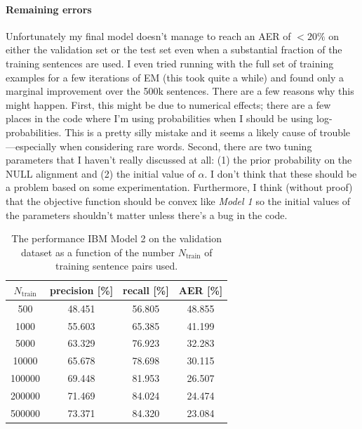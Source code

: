 \documentclass[11pt]{article}
\newcommand{\code}[1]{{\sffamily #1}}
\begin{document}
\paragraph{Remaining errors}
Unfortunately my final model doesn't manage to reach an AER of $<20\%$ on
either the validation set or the test set even when a substantial fraction of
the training sentences are used.
I even tried running with the full set of training examples for a few
iterations of EM (this took quite a while) and found only a marginal
improvement over the 500k sentences.
There are a few reasons why this might happen.
First, this might be due to numerical effects; there are a few places in the
code where I'm using probabilities when I should be using log-probabilities.
This is a pretty silly mistake and it seems a likely cause of
trouble---especially when considering rare words.
Second, there are two tuning parameters that I haven't really discussed at
all: (1) the prior probability on the \code{NULL} alignment and (2) the
initial value of $\alpha$.
I don't think that these should be a problem based on some experimentation.
Furthermore, I think (without proof) that the objective function should be
convex like \emph{Model 1} so the initial values of the parameters shouldn't
matter unless there's a bug in the code.

\begin{table}[htbp]
\begin{center}
\begin{tabular}{c ccc}
\toprule
$N_\mathrm{train}$ & precision [\%] & recall [\%] & AER [\%] \\\midrule
500 & 48.451 & 56.805 & 48.855 \\
1000 & 55.603 & 65.385 & 41.199 \\
5000 & 63.329 & 76.923 & 32.283 \\
10000 & 65.678 & 78.698 & 30.115 \\
100000 & 69.448 & 81.953 & 26.507 \\
200000 & 71.469 & 84.024 & 24.474 \\
500000 & 73.371 & 84.320 & 23.084 \\
\bottomrule
\end{tabular}
\end{center}
\caption{%
The performance IBM Model 2 on the validation dataset
as a function of the number $N_\mathrm{train}$ of training sentence pairs used.
\label{tab:model2}}
\end{table}
\end{document}
